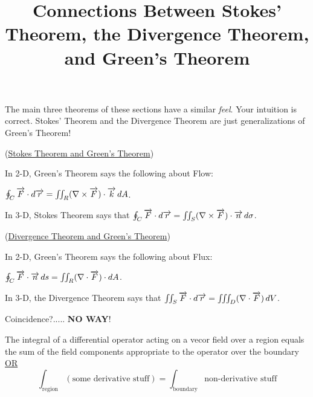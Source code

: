 \documentclass{ximera}
\title[Dig-In:]{Connections Between Stokes' Theorem, the Divergence Theorem, and Green's Theorem}
\begin{document}
\begin{abstract}
\end{abstract}
\maketitle

The main three theorems of these sections have a similar {\it feel}. Your intuition is correct.
Stokes' Theorem and the Divergence Theorem are just generalizations of Green's Theorem!

\begin{explanation}
(\underline{Stokes Theorem and Green's Theorem})

In 2-D, Green's Theorem says the following about Flow: 

$\oint_C \overrightarrow{F} \cdot \mathop{}\!d \overrightarrow{r} 
= \iint_R (\nabla \times \overrightarrow{F})\cdot \overrightarrow{k} \mathop{}\!d A$.

In 3-D, Stokes Theorem says that $\oint_C \overrightarrow{F} \cdot \mathop{}\!d \overrightarrow{r} 
= \iint_S (\nabla \times \overrightarrow{F})\cdot \overrightarrow{n} \mathop{}\!d \sigma$.
\end{explanation}

\begin{explanation}
(\underline{Divergence Theorem and Green's Theorem})

In 2-D, Green's Theorem says the following about Flux: 

$\oint_C \overrightarrow{F} \cdot \overrightarrow{n} \mathop{}\!d s
= \iint_R (\nabla \cdot \overrightarrow{F})\cdot \mathop{}\!d A$.

In 3-D, the Divergence Theorem says that $\iint_S \overrightarrow{F} \cdot \mathop{}\!d \overrightarrow{r} 
= \iiint_D (\nabla \cdot \overrightarrow{F}) \mathop{}\!d V$.

Coincidence?..... {\bf NO WAY}!
\end{explanation}


\begin{theorem}
The integral of a differential operator acting on a vecor field over a region equals the sum of the field components appropriate to the operator over the boundary \underline{OR}
\[
\int_{\text{region}} (\text{some derivative stuff}) = \int_{\text{boundary}} \text{non-derivative stuff}
\]
\end{theorem}
\end{document}

